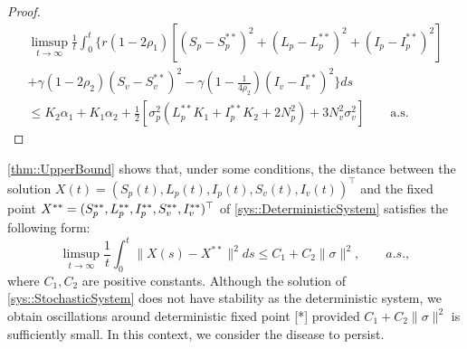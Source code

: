 \begin{proof}
	\begin{multline*}
	 	\limsup
	 	\limits_{t \to 	\infty}
	 	\frac{1}{t}
	 	\int_{0}^{t}
	 		\{
	 			r
	 			\left(
	 				1 - 2 \rho_1
	 			\right)
	 			\left[
	 				(S_p - S_p ^{**}) ^ 2 + 
	 				(L_p - L_p ^{**}) ^ 2 +
	 				(I_p - I_p ^{**}) ^ 2
	 			\right]
	 	\\
	 	+
	 		\gamma
	 		\left(
	 			1 - 2 \rho_2
	 		\right)
	 		(S_v - S_v^{**}) ^ 2 - 
	 		\gamma
	 		\left( 1 - 
	 			\frac{1}{4\rho_2}
	 		\right)(I_v-I_v^{**})^2\}
	 		ds
	 	\\
	 	\leq
	 		K_2
	 		\alpha_1 + 
	 		K_1 \alpha_2 + 
	 		\frac{1}{2}
	 		\left[
	 			\sigma_p^2(
	 				L_p ^{**} K_1 + 
	 				I_p ^{**} K_2 + 
	 				2N_p^2
	 			) + 
	 			3 N_v ^ 2
	 			\sigma_v ^ 2
	 		\right]
	 	\qquad 
	 	\mbox{a.s.}
 	\end{multline*}
 \end{proof}
\begin{remark}
\autoref{thm::UpperBound} shows that, under some conditions, the distance between the solution 
 	$
 		X(t)=(S_p(t),L_p(t),I_p(t),S_v(t),I_v(t))^\top
 	$ 
 	and the fixed point 
 	$
 		X^{**}=(S_p^{**},L_p^{**},\\I_p^{**},S_v^{**},I_v^{**})^\top
 	$ of \autoref{sys::DeterministicSystem} satisfies the following form:
 	\begin{equation*}
  		\limsup_{t\to\infty}
  		\frac{1}{t}
  		\int_{0} ^ {t}
  			\|X(s) - X ^{**}\| ^ 2 
  		ds
  		\leq 
  		C_1 + C_2
  		\|\sigma\| ^ 2,
  		\qquad a.s.,
 	\end{equation*}
 	where $C_1, C_2$ are positive constants. Although the solution of
 	\autoref{sys::StochasticSystem} does not have stability as the 
 	deterministic system, we obtain oscillations around deterministic fixed point
 	[*] provided 
 	$
 		C_1 + C_2 
 		\|\sigma\|^2
 	$ is sufficiently small. In this context, we consider the disease to persist.
\end{remark}
